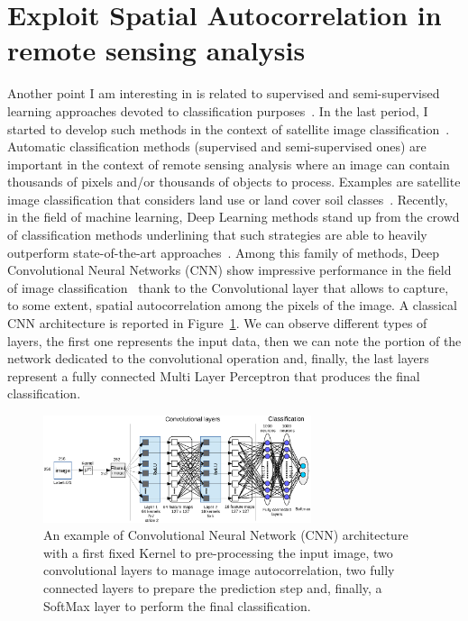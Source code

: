 \section{Exploit Spatial Autocorrelation in remote sensing analysis}
Another point I am interesting in is related to supervised and semi-supervised learning approaches devoted to classification purposes~\cite{MeoBI12,iencoNeuro16,iencoTNNLS16}. In the last period, I started to develop such methods in the context of satellite image classification~\cite{PitarchIVBLPST15,Guttler16}. Automatic classification methods (supervised and semi-supervised ones) are important in the context of remote sensing analysis where an image can contain thousands of pixels and/or thousands of objects to process. Examples are satellite image classification that considers land use or land cover soil classes~\cite{PitarchIVBLPST15}. Recently, in the field of machine learning, Deep Learning methods stand up from the crowd of classification methods underlining that such strategies are able to heavily outperform state-of-the-art approaches~\cite{LeCun15}.
Among this family of methods, Deep Convolutional Neural Networks (CNN) show impressive performance in the field of image classification~\cite{LeCun15} thank to the Convolutional layer that allows to capture, to some extent, spatial autocorrelation among the pixels of the image.
A classical CNN architecture is reported in Figure~\ref{cnn_example}. We can observe different types of layers, the first one represents the input data, then we can note the portion of the network dedicated to the convolutional operation and, finally, the last layers represent a fully connected Multi Layer Perceptron that produces the final classification.

\begin{figure}[!ht]
	\begin{center}
		\includegraphics[width=0.70\textwidth]{Figures/CNN_eng.eps}
	\end{center}

	\caption{An example of Convolutional Neural Network (CNN) architecture with a first fixed Kernel to pre-processing the input image, two convolutional layers to manage image autocorrelation, two fully connected layers to prepare the prediction step and, finally, a SoftMax layer to perform the final classification. \label{cnn_example}}
\end{figure}

